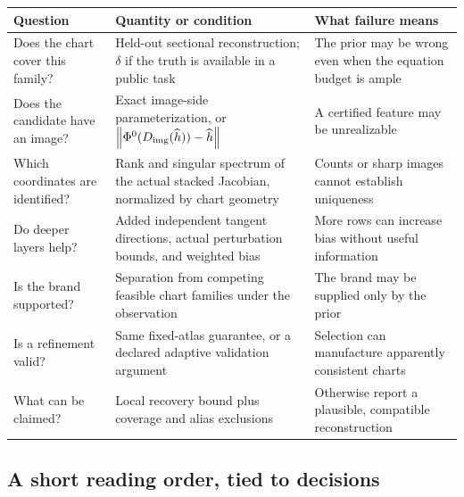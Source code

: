 \documentclass[11pt,a4paper]{article}
\theoremstyle{definition}
\theoremstyle{definition}
\theoremstyle{remark}\newtheorem{remark}[theorem]{Remark}
\newcommand{\norm}[1]{\left\lVert #1\right\rVert}
\begin{document}
\begin{center}
\small
\begin{longtable}{@{}Y{.23\textwidth}Y{.34\textwidth}Y{.33\textwidth}@{}}
\toprule
Question & Quantity or condition & What failure means\\
\midrule
\endhead
Does the chart cover this family? & Held-out sectional reconstruction; $\delta$ if the truth is available in a public task & The prior may be wrong even when the equation budget is ample\\[4pt]
Does the candidate have an image? & Exact image-side parameterization, or $\norm{\Phi^0(D_{\rm img}(\widehat h))-\widehat h}$ & A certified feature may be unrealizable\\[4pt]
Which coordinates are identified? & Rank and singular spectrum of the actual stacked Jacobian, normalized by chart geometry & Counts or sharp images cannot establish uniqueness\\[4pt]
Do deeper layers help? & Added independent tangent directions, actual perturbation bounds, and weighted bias & More rows can increase bias without useful information\\[4pt]
Is the brand supported? & Separation from competing feasible chart families under the observation & The brand may be supplied only by the prior\\[4pt]
Is a refinement valid? & Same fixed-atlas guarantee, or a declared adaptive validation argument & Selection can manufacture apparently consistent charts\\[4pt]
What can be claimed? & Local recovery bound plus coverage and alias exclusions & Otherwise report a plausible, compatible reconstruction\\
\bottomrule
\end{longtable}
\end{center}

\subsection{A short reading order, tied to decisions}
\end{document}
